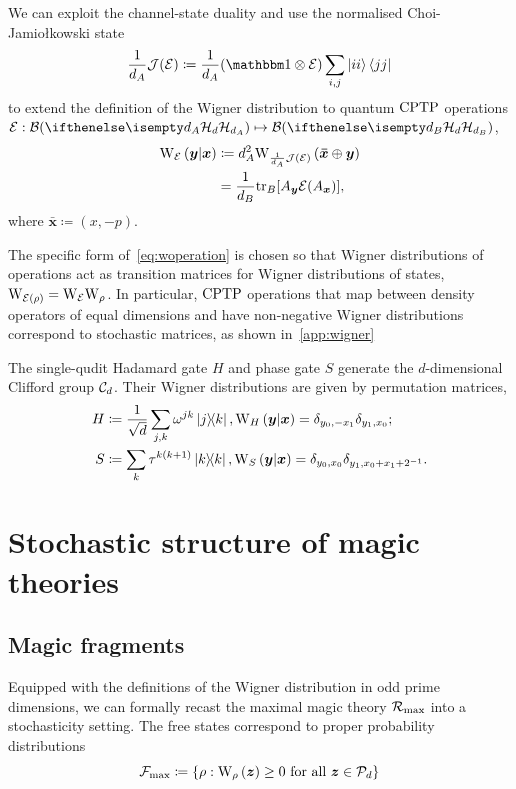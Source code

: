 \documentclass[pra,
aps,
twocolumn,
superscriptaddress,
groupedaddress,
nofootinbib,
reprint
]{revtex4-1}
\begin{document}
We can exploit the channel-state duality and use the normalised Choi-Jamio\l{}kowski state 
\begin{equation}\label{eq:cj}
    \frac{1}{d_A}\J(\E) \coloneqq \frac{1}{d_A}(\id \otimes \E) \sum_{i,j} \ket{ii}\bra{jj}
\end{equation}
to extend the definition of the Wigner distribution to quantum $\cptp$ operations $\E: \cal{B}(\hd[d_A]) \mapsto \cal{B}(\hd[d_B])$, 
\begin{align}\label{eq:woperation}
    \W[\bmy|\bmx]{\E} 
    &\coloneqq d_A^2 \W[\bm{\bar x} \oplus \bmy]{\frac{1}{d_A}\J(\E)} \\
    &= \frac{1}{d_B} \tr_B[A_{\bmy} \E(A_{\bmx})],
\end{align}
where $\bm{\bar x} \coloneqq (x, -p)$.

The specific form of~\cref{eq:woperation} is chosen so that Wigner distributions of operations act as transition matrices for Wigner distributions of states, $\W{\E(\rho)} = \W{\E}\W{\rho}$.
In particular, $\cptp$ operations that map between density operators of equal dimensions and have non-negative Wigner distributions correspond to stochastic matrices, as shown in~\cref{app:wigner}

The single-qudit Hadamard gate $H$ and phase gate $S$ generate the $d$-dimensional Clifford group $\cal{C}_d$. 
Their Wigner distributions are given by permutation matrices,
\begin{align}
    H &\coloneqq \frac{1}{\sqrt{d}}\sum_{j,k} \omega^{jk} \ketbra{j}{k}, \W[\bmy|\bmx]{H} = \delta_{y_0, -x_1}\delta_{y_1, x_0};\label{eq:H}\\
    S &\coloneqq \sum_k \tau^{k(k+1)} \ketbra{k}{k}, \W[\bmy|\bmx]{S} = \delta_{y_0, x_0}\delta_{y_1, x_0 + x_1 + 2^{-1}}.\label{eq:S}
\end{align}


\section{Stochastic structure of magic theories}
\label{sec:struc}

\subsection{Magic fragments}\label{sec:magfrag}

Equipped with the definitions of the Wigner distribution in odd prime dimensions, we can formally recast the maximal magic theory $\Rmax$ into a stochasticity setting.
The free states correspond to proper probability distributions 
\begin{equation}
    \Fmax \coloneqq \{ \rho: \W[\bmz]{\rho} \geq 0 \text{ for all } \bmz \in \cal{P}_d\}
\end{equation}
\end{document}
